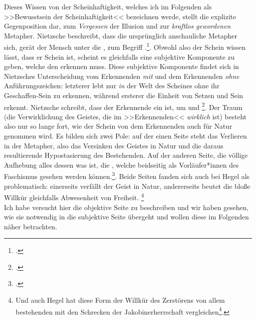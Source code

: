 \documentclass[12pt, a4paper, openany]{report}
\begin{document}
Dieses Wissen von der Scheinhaftigkeit, welches ich im Folgenden als >>Bewusstsein der Scheinhaftigkeit<< bezeichnen werde, stellt die explizite Gegenposition dar, zum \emph{Vergessen} der Illusion und zur \emph{kraftlos gewordenen} Metapher.
Nietzsche beschreibt, dass die ursprünglich anschauliche Metapher sich, gerät der Mensch unter die , zum Begriff .\footcite[][881]{nietzsche_geburt_1999}.
Obwohl also der Schein wissen lässt, dass er Schein ist, scheint es gleichfalls eine subjektive Komponente zu geben, welche den  erkennen muss.
Diese subjektive Komponente findet sich in Nietzsches Unterscheidung vom Erkennenden \emph{mit} und dem Erkennenden \emph{ohne} Anführungszeichen:
letzterer lebt nur \emph{in} der Welt des Scheines ohne ihr Geschaffen-Sein zu erkennen, während ersterer die Einheit von Setzen und Sein erkennt. 
Nietzsche schreibt, dass der Erkennende ein  ist, um  und \footcite[][§ 54, S. 417. Im Original gesperrt gedruckt.]{nietzsche_morgenrote_1999}.
Der Traum (die Verwirklichung des Geistes, die im >>Erkennenden<< \emph{wirklich} ist) besteht also nur so lange fort, wie der Schein von dem Erkennenden auch für Natur genommen wird. 
Es bilden sich zwei Pole:
auf der einen Seite steht das Verlieren in der Metapher, also das Versinken des Geistes in Natur und die daraus resultierende Hypostasierung des Bestehenden.
Auf der anderen Seite, die völlige Aufhebung alles dessen was ist, die , welche beidseitig als Vorläufer*innen des Faschismus gesehen werden können.\footcite[Vergleiche dazu beispielsweise:][S. 61, S. 69]{stephan_nietzscheanismus_2019}.
Beide Seiten fanden sich auch bei Hegel als problematisch:
einerseits verfällt der Geist in Natur, andererseits beutet die bloße Willkür gleichfalls Abwesenheit von Freiheit.%
\footnote{
    Und auch Hegel hat diese Form der Willkür des Zerstörens von allem bestehenden mit den Schrecken der Jakobinerherrschaft vergleichen\footcite[Vgl.][39]{hegel_grundlinien_2017}.
}\\

Ich habe versucht hier die objektive Seite zu beschreiben und wir haben gesehen, wie sie notwendig in die subjektive Seite übergeht und wollen diese im Folgenden näher betrachten.
\end{document}
